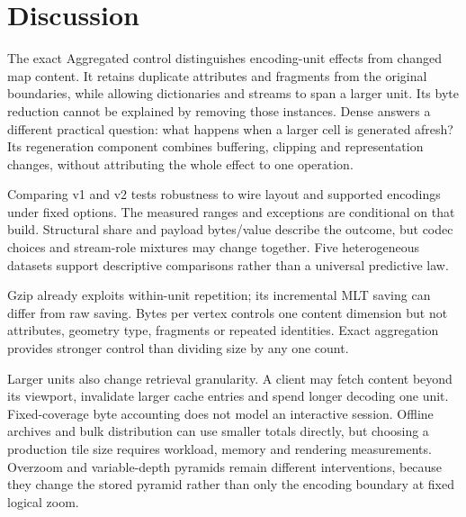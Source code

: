 \section{Discussion}\label{sec:discussion}
The exact Aggregated control distinguishes encoding-unit effects from changed map
content. It retains duplicate attributes and fragments from the original boundaries,
while allowing dictionaries and streams to span a larger unit. Its byte reduction
cannot be explained by removing those instances. Dense answers a different practical
question: what happens when a larger cell is generated afresh? Its regeneration
component combines buffering, clipping and representation changes, without attributing
the whole effect to one operation.

Comparing v1 and v2 tests robustness to wire layout and supported encodings under
fixed options. The measured ranges and exceptions are conditional on that build.
Structural share and payload bytes/value describe the outcome, but codec choices and
stream-role mixtures may change together. Five heterogeneous datasets support
descriptive comparisons rather than a universal predictive law.

Gzip already exploits within-unit repetition; its incremental MLT saving can differ
from raw saving. Bytes per vertex controls one content dimension but not attributes,
geometry type, fragments or repeated identities. Exact aggregation provides stronger
control than dividing size by any one count.

Larger units also change retrieval granularity. A client may fetch content beyond
its viewport, invalidate larger cache entries and spend longer decoding one unit.
Fixed-coverage byte accounting does not model an interactive session. Offline archives
and bulk distribution can use smaller totals directly, but choosing a production
tile size requires workload, memory and rendering measurements. Overzoom and
variable-depth pyramids remain different interventions, because they change the
stored pyramid rather than only the encoding boundary at fixed logical zoom.
